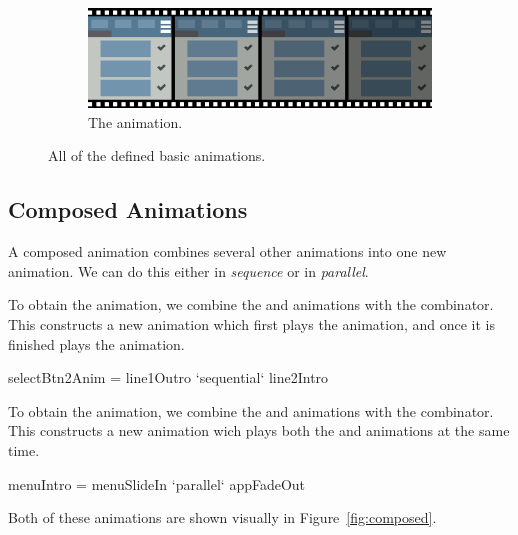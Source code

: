 \begin{figure}[!htbp]
\begin{subfigure}[h]{\textwidth}
\centering
\includegraphics[width=\figscale\textwidth]{pictures/appFadeOutFig}
\caption{The  animation.}
\label{fig:basic2_2}
\end{subfigure}

\caption{All of the defined basic animations.}
\label{fig:basic}
\end{figure}

\subsection{Composed Animations}

A composed animation combines several other animations into one new animation. We can do this either in \emph{sequence} or in \emph{parallel}.

To obtain the  animation, we combine the  and  animations with the  combinator. This constructs a new animation which first plays the  animation, and once it is finished plays the  animation.

\begin{spec}
selectBtn2Anim = line1Outro `sequential` line2Intro
\end{spec}

To obtain the  animation, we combine the  and  animations with the  combinator. This constructs a new animation wich plays both the  and  animations at the same time.

\begin{spec}
menuIntro = menuSlideIn `parallel` appFadeOut
\end{spec}

Both of these animations are shown visually in Figure~\ref{fig:composed}.

